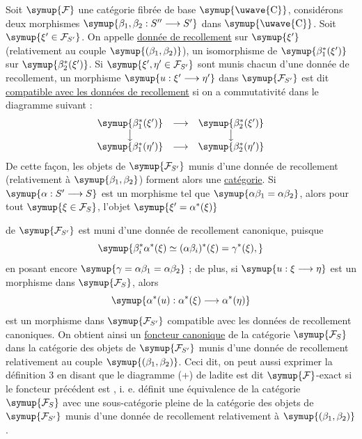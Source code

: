  Soit $\symup{\mathcal F}$ une catégorie fibrée de base
$\symup{\text{\uwave{C}}}$, considérons deux morphismes $\symup{\beta_1,\beta_2:S''\longrightarrow S'}$ dans $\symup{\text{\uwave{C}}}$. Soit
$\symup{\xi'\in\mathcal F_{S'}}$. On appelle \uline{donnée de recollement} sur $\symup{\xi'}$
(relativement au couple $\symup{(\beta_1,\beta_2)}$), un isomorphisme de
$\symup{\beta_1^*(\xi')}$ sur $\symup{\beta_2^*(\xi')}$. Si $\symup{\xi',\eta'\in\mathcal F_{S'}}$
sont munis chacun d'une donnée de recollement, un morphisme
$\symup{u:\xi'\longrightarrow\eta'}$ dans $\symup{\mathcal F_{S'}}$ est dit
\uline{compatible avec les données de recollement} si on a commutativité dans
le diagramme suivant :
\[
\begin{array}{ccc}
  \symup{\beta_1^*(\xi')} & \longrightarrow & \symup{\beta_2^*(\xi')} \\
  \big\downarrow && \big\downarrow \\
  \symup{\beta_1^*(\eta')} & \longrightarrow & \symup{\beta_2^*(\eta')}
\end{array}
\]
De cette façon, les objets de $\symup{\mathcal F_{S'}}$ munis d'une donnée de
recollement (relativement à $\symup{\beta_1,\beta_2}$) forment alors une \uline{catégorie}. Si
$\symup{\alpha:S'\longrightarrow S}$ est un morphisme tel que
$\symup{\alpha\beta_1=\alpha\beta_2}$, alors pour tout $\symup{\xi\in\mathcal F_S}$, l'objet
$\symup{\xi'=\alpha^*(\xi)}$

de $\symup{\mathcal F_{S'}}$ est muni d'une donnée de recollement canonique, puisque
\[
  \symup{\beta_i^*\alpha^*(\xi)\simeq(\alpha\beta_i)^*(\xi)=\gamma^*(\xi),}
\]
en posant encore $\symup{\gamma=\alpha\beta_1=\alpha\beta_2}$ ; de plus, si
$\symup{u:\xi\longrightarrow\eta}$ est un morphisme dans $\symup{\mathcal F_S}$, alors
\[
  \symup{\alpha^*(u):\alpha^*(\xi)\longrightarrow\alpha^*(\eta)}
\]
est un morphisme dans $\symup{\mathcal F_{S'}}$ compatible avec les données de
recollement canoniques. On obtient ainsi un \uline{foncteur canonique} de la catégorie
$\symup{\mathcal F_S}$ dans la catégorie des objets de $\symup{\mathcal F_{S'}}$ munis d'une
donnée de recollement relativement au couple $\symup{(\beta_1,\beta_2)}$. Ceci dit, on
peut aussi exprimer la définition 3 en disant que le diagramme (+) de ladite est dit $\symup{\mathcal F}$-exact si le foncteur précédent est , i. e. définit une équivalence de la catégorie $\symup{\mathcal F_S}$ avec une
sous-catégorie pleine de la catégorie des objets de $\symup{\mathcal F_{S'}}$ munis d'une
donnée de recollement relativement à $\symup{(\beta_1,\beta_2)}$.

